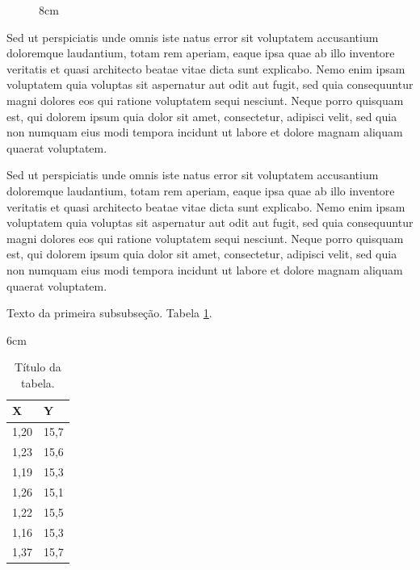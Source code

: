 \begin{figure}[!h]{8cm}
\end{figure}


Sed ut perspiciatis unde omnis iste natus error sit voluptatem accusantium doloremque laudantium, totam rem aperiam, eaque ipsa quae ab illo inventore veritatis et quasi architecto beatae vitae dicta sunt explicabo. Nemo enim ipsam voluptatem quia voluptas sit aspernatur aut odit aut fugit, sed quia consequuntur magni dolores eos qui ratione voluptatem sequi nesciunt. Neque porro quisquam est, qui dolorem ipsum quia dolor sit amet, consectetur, adipisci velit, sed quia non numquam eius modi tempora incidunt ut labore et dolore magnam aliquam quaerat voluptatem.


Sed ut perspiciatis unde omnis iste natus error sit voluptatem accusantium doloremque laudantium, totam rem aperiam, eaque ipsa quae ab illo inventore veritatis et quasi architecto beatae vitae dicta sunt explicabo. Nemo enim ipsam voluptatem quia voluptas sit aspernatur aut odit aut fugit, sed quia consequuntur magni dolores eos qui ratione voluptatem sequi nesciunt. Neque porro quisquam est, qui dolorem ipsum quia dolor sit amet, consectetur, adipisci velit, sed quia non numquam eius modi tempora incidunt ut labore et dolore magnam aliquam quaerat voluptatem.


Texto da primeira subsubseção. Tabela \ref{mais.rotulo}.

\begin{table}[!h]{6cm}
	\caption{Título da tabela.}\label{mais.rotulo}
	\centering
	\renewcommand\arraystretch{1.0}
	\begin{tabular}{l|l}
		\hline
		X & Y\\
		\hline
		1,20 & 15,7\\
		1,23 & 15,6\\
		1,19 & 15,3\\
		1,26 & 15,1\\
		1,22 & 15,5\\
		1,16 & 15,3\\
		1,37 & 15,7\\
		\hline
	\end{tabular}
\end{table}

